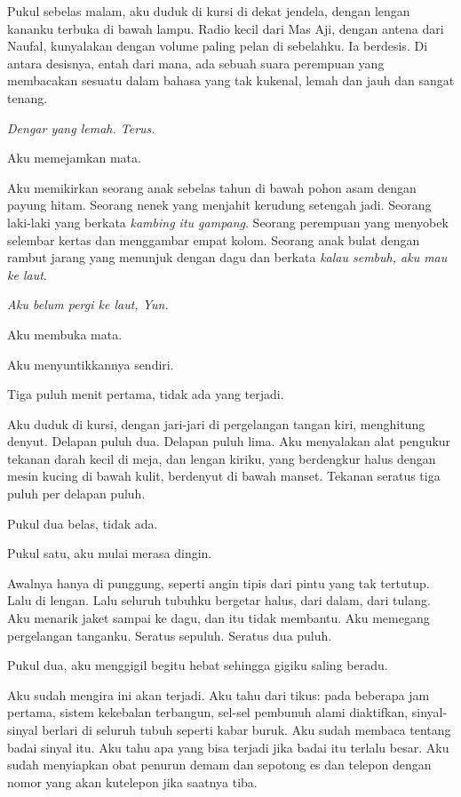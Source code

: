 \documentclass[11pt,twoside,openany]{book}
\makeatletter
\newcommand{\scenebreak}{\par\vspace{0.9em}{\centering\textsc{*\hspace{0.7em}*\hspace{0.7em}*}\par}\vspace{0.9em}\@afterindentfalse\@afterheading}
\makeatother
\begin{document}
Pukul sebelas malam, aku duduk di kursi di dekat jendela, dengan lengan kananku terbuka di bawah lampu. Radio kecil dari Mas Aji, dengan antena dari Naufal, kunyalakan dengan volume paling pelan di sebelahku. Ia berdesis. Di antara desisnya, entah dari mana, ada sebuah suara perempuan yang membacakan sesuatu dalam bahasa yang tak kukenal, lemah dan jauh dan sangat tenang.

\emph{Dengar yang lemah. Terus.}

Aku memejamkan mata.

Aku memikirkan seorang anak sebelas tahun di bawah pohon asam dengan payung hitam. Seorang nenek yang menjahit kerudung setengah jadi. Seorang laki-laki yang berkata \emph{kambing itu gampang}. Seorang perempuan yang menyobek selembar kertas dan menggambar empat kolom. Seorang anak bulat dengan rambut jarang yang menunjuk dengan dagu dan berkata \emph{kalau sembuh, aku mau ke laut}.

\emph{Aku belum pergi ke laut, Yun.}

Aku membuka mata.

Aku menyuntikkannya sendiri.

\scenebreak
Tiga puluh menit pertama, tidak ada yang terjadi.

Aku duduk di kursi, dengan jari-jari di pergelangan tangan kiri, menghitung denyut. Delapan puluh dua. Delapan puluh lima. Aku menyalakan alat pengukur tekanan darah kecil di meja, dan lengan kiriku, yang berdengkur halus dengan mesin kucing di bawah kulit, berdenyut di bawah manset. Tekanan seratus tiga puluh per delapan puluh.

Pukul dua belas, tidak ada.

Pukul satu, aku mulai merasa dingin.

Awalnya hanya di punggung, seperti angin tipis dari pintu yang tak tertutup. Lalu di lengan. Lalu seluruh tubuhku bergetar halus, dari dalam, dari tulang. Aku menarik jaket sampai ke dagu, dan itu tidak membantu. Aku memegang pergelangan tanganku. Seratus sepuluh. Seratus dua puluh.

Pukul dua, aku menggigil begitu hebat sehingga gigiku saling beradu.

Aku sudah mengira ini akan terjadi. Aku tahu dari tikus: pada beberapa jam pertama, sistem kekebalan terbangun, sel-sel pembunuh alami diaktifkan, sinyal-sinyal berlari di seluruh tubuh seperti kabar buruk. Aku sudah membaca tentang badai sinyal itu. Aku tahu apa yang bisa terjadi jika badai itu terlalu besar. Aku sudah menyiapkan obat penurun demam dan sepotong es dan telepon dengan nomor yang akan kutelepon jika saatnya tiba.
\end{document}
